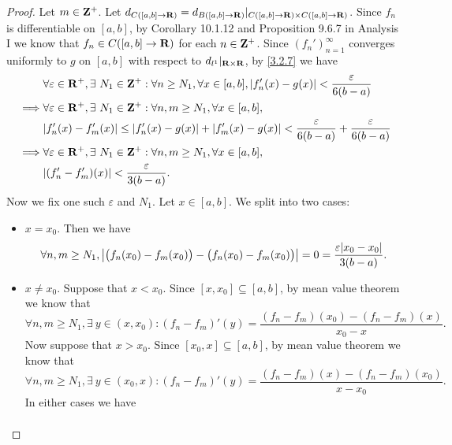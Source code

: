 \begin{proof}
  Let \(m \in \mathbf{Z}^+\).
  Let \(d_{C([a, b] \to \mathbf{R})} = d_{B([a, b] \to \mathbf{R})}|_{C([a, b] \to \mathbf{R}) \times C([a, b] \to \mathbf{R})}\).
  Since \(f_n\) is differentiable on \([a, b]\), by Corollary 10.1.12 and Proposition 9.6.7 in Analysis I we know that \(f_n \in C([a, b] \to \mathbf{R})\) for each \(n \in \mathbf{Z}^+\).
  Since \((f_n')_{n = 1}^\infty\) converges uniformly to \(g\) on \([a, b]\) with respect to \(d_{l^1}|_{\mathbf{R} \times \mathbf{R}}\), by \cref{3.2.7} we have
  \begin{align*}
             & \forall \varepsilon \in \R^+, \exists\ N_1 \in \Z^+ : \forall n \geq N_1, \forall x \in [a, b], \abs{f_n'(x) - g(x)} < \frac{\varepsilon}{6(b - a)} \\
    \implies & \forall \varepsilon \in \R^+, \exists\ N_1 \in \Z^+ : \forall n, m \geq N_1, \forall x \in [a, b],                                                  \\
             & \abs{f_n'(x) - f_m'(x)} \leq \abs{f_n'(x) - g(x)} + \abs{f_m'(x) - g(x)} < \frac{\varepsilon}{6(b - a)} + \frac{\varepsilon}{6(b - a)}              \\
    \implies & \forall \varepsilon \in \R^+, \exists\ N_1 \in \Z^+ : \forall n, m \geq N_1, \forall x \in [a, b],                                                  \\
             & \abs{(f_n' - f_m')(x)} < \frac{\varepsilon}{3(b - a)}.
  \end{align*}
  Now we fix one such \(\varepsilon\) and \(N_1\).
  Let \(x \in [a, b]\).
  We split into two cases:
  \begin{itemize}
    \item \(x = x_0\).
          Then we have
          \[
            \forall n, m \geq N_1, \abs{\big(f_n(x_0) - f_m(x_0)\big) - \big(f_n(x_0) - f_m(x_0)\big)} = 0 = \frac{\varepsilon \abs{x_0 - x_0}}{3(b - a)}.
          \]
    \item \(x \neq x_0\).
          Suppose that \(x < x_0\).
          Since \([x, x_0] \subseteq [a, b]\), by mean value theorem we know that
          \[
            \forall n, m \geq N_1, \exists\ y \in (x, x_0) : (f_n - f_m)'(y) = \frac{(f_n - f_m)(x_0) - (f_n - f_m)(x)}{x_0 - x}.
          \]
          Now suppose that \(x > x_0\).
          Since \([x_0, x] \subseteq [a, b]\), by mean value theorem we know that
          \[
            \forall n, m \geq N_1, \exists\ y \in (x_0, x) : (f_n - f_m)'(y) = \frac{(f_n - f_m)(x) - (f_n - f_m)(x_0)}{x - x_0}.
          \]
          In either cases we have
          \begin{align*}

\end{align*}
\end{itemize}
\end{proof}
